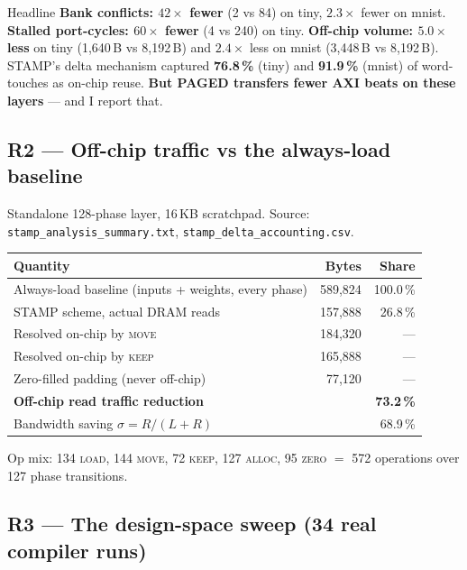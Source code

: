 \documentclass[11pt,a4paper]{article}
\newcommand{\op}[1]{\textsc{#1}}
\newcommand{\file}[1]{\texttt{\small #1}}
\begin{document}
\begin{keybox}{Headline}
\textbf{Bank conflicts: $42\times$ fewer} (2 vs 84) on tiny, $2.3\times$ fewer
on mnist. \textbf{Stalled port-cycles: $60\times$ fewer} (4 vs 240) on tiny.
\textbf{Off-chip volume: $5.0\times$ less} on tiny (1{,}640\,B vs 8{,}192\,B)
and $2.4\times$ less on mnist (3{,}448\,B vs 8{,}192\,B). STAMP's delta
mechanism captured \textbf{76.8\,\%} (tiny) and \textbf{91.9\,\%} (mnist) of
word-touches as on-chip reuse. \textbf{But PAGED transfers fewer AXI beats on
these layers} --- and I report that.
\end{keybox}

\subsection{R2 --- Off-chip traffic vs the always-load baseline}

Standalone 128-phase layer, 16\,KB scratchpad. Source:
\file{stamp\_analysis\_summary.txt}, \file{stamp\_delta\_accounting.csv}.

\begin{center}
\small
\begin{tabular}{@{}lrr@{}}
\toprule
\textbf{Quantity} & \textbf{Bytes} & \textbf{Share} \\
\midrule
Always-load baseline (inputs + weights, every phase) & 589{,}824 & 100.0\,\% \\
STAMP scheme, actual DRAM reads                      & 157{,}888 & 26.8\,\% \\
\midrule
Resolved on-chip by \op{move} & 184{,}320 & --- \\
Resolved on-chip by \op{keep} & 165{,}888 & --- \\
Zero-filled padding (never off-chip) & 77{,}120 & --- \\
\midrule
\textbf{Off-chip read traffic reduction} & \multicolumn{2}{r}{\textbf{73.2\,\%}} \\
Bandwidth saving $\sigma = R/(L{+}R)$    & \multicolumn{2}{r}{68.9\,\%} \\
\bottomrule
\end{tabular}
\end{center}

\noindent Op mix: 134 \op{load}, 144 \op{move}, 72 \op{keep}, 127 \op{alloc},
95 \op{zero} $=$ 572 operations over 127 phase transitions.

\subsection{R3 --- The design-space sweep (34 real compiler runs)}
\end{document}
